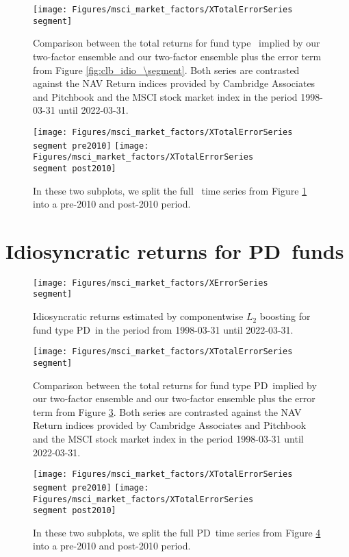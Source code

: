 \begin{figure}[H]
	\centering
	\texttt{[image: Figures/msci\_market\_factors/XTotalErrorSeries\\segment]}
	\caption{
		Comparison between the total returns for fund type \segment \ implied by our two-factor ensemble and our two-factor ensemble plus the error term from Figure \ref{fig:clb_idio_\segment}.
		Both series are contrasted against the NAV Return indices provided by Cambridge Associates and Pitchbook and the MSCI stock market index in the period 1998-03-31 until 2022-03-31.
	}
	\label{fig:clb_total_\segment}
\end{figure}

\begin{figure}[H]
	\centering
	\texttt{[image: Figures/msci\_market\_factors/XTotalErrorSeries\\segment pre2010]}
	\texttt{[image: Figures/msci\_market\_factors/XTotalErrorSeries\\segment post2010]}
	\caption{
		In these two subplots, we split the full \segment \ time series from Figure \ref{fig:clb_total_\segment} into a pre-2010 and post-2010 period.
	}
	\label{fig:clb_pre_post_2010_\segment}
\end{figure}


\renewcommand{\segment}{PD}

\section{Idiosyncratic returns for \segment \ funds}
\label{sec:errors_pd}

\begin{figure}[H]
	\centering
	\texttt{[image: Figures/msci\_market\_factors/XErrorSeries\\segment]}
	\caption{Idiosyncratic returns estimated by componentwise $L_2$ boosting for fund type \segment \ in the period from 1998-03-31 until 2022-03-31.}
	\label{fig:clb_idio_\segment}
\end{figure}

\begin{figure}[H]
	\centering
	\texttt{[image: Figures/msci\_market\_factors/XTotalErrorSeries\\segment]}
	\caption{
		Comparison between the total returns for fund type \segment \ implied by our two-factor ensemble and our two-factor ensemble plus the error term from Figure \ref{fig:clb_idio_\segment}.
		Both series are contrasted against the NAV Return indices provided by Cambridge Associates and Pitchbook and the MSCI stock market index in the period 1998-03-31 until 2022-03-31.
	}
	\label{fig:clb_total_\segment}
\end{figure}

\begin{figure}[H]
	\centering
	\texttt{[image: Figures/msci\_market\_factors/XTotalErrorSeries\\segment pre2010]}
	\texttt{[image: Figures/msci\_market\_factors/XTotalErrorSeries\\segment post2010]}
	\caption{
		In these two subplots, we split the full \segment \ time series from Figure \ref{fig:clb_total_\segment} into a pre-2010 and post-2010 period.
	}
	\label{fig:clb_pre_post_2010_\segment}
\end{figure}

